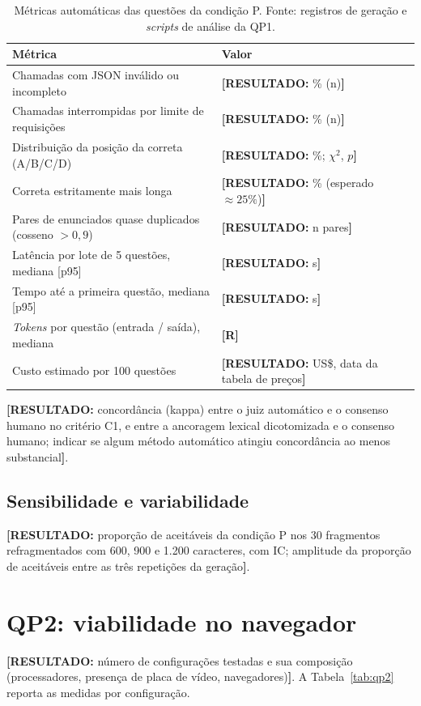 \documentclass[portuguese,oneside]{tcc}
\newcommand{\estr}[1]{\emph{#1}}
\newcommand{\resultado}[1]{\textcolor{red!70!black}{\textbf{[RESULTADO:} #1\textbf{]}}}
\newcommand{\rr}{\textcolor{red!70!black}{\textbf{[R]}}}
\begin{document}
\begin{table}[htbp]
\centering
\caption{Métricas automáticas das questões da condição P. Fonte: registros de geração e \estr{scripts} de análise da QP1.}
\label{tab:qp1-auto}
\small
\begin{tabularx}{\textwidth}{>{\raggedright\arraybackslash}X l}
\toprule
Métrica & Valor \\
\midrule
Chamadas com JSON inválido ou incompleto & \resultado{\% (n)} \\
Chamadas interrompidas por limite de requisições & \resultado{\% (n)} \\
Distribuição da posição da correta (A/B/C/D) & \resultado{\%; $\chi^2$, $p$} \\
Correta estritamente mais longa & \resultado{\% (esperado $\approx 25\%$)} \\
Pares de enunciados quase duplicados (cosseno $> 0{,}9$) & \resultado{n pares} \\
Latência por lote de 5 questões, mediana [p95] & \resultado{s} \\
Tempo até a primeira questão, mediana [p95] & \resultado{s} \\
\estr{Tokens} por questão (entrada / saída), mediana & \rr \\
Custo estimado por 100 questões & \resultado{US\$, data da tabela de preços} \\
\bottomrule
\end{tabularx}
\end{table}

\resultado{concordância (kappa) entre o juiz automático e o consenso humano no critério C1, e entre a ancoragem lexical dicotomizada e o consenso humano; indicar se algum método automático atingiu concordância ao menos substancial}.

\subsection{Sensibilidade e variabilidade}

\resultado{proporção de aceitáveis da condição P nos 30 fragmentos refragmentados com 600, 900 e 1.200 caracteres, com IC; amplitude da proporção de aceitáveis entre as três repetições da geração}.

\section{QP2: viabilidade no navegador}

\resultado{número de configurações testadas e sua composição (processadores, presença de placa de vídeo, navegadores)}. A Tabela~\ref{tab:qp2} reporta as medidas por configuração.
\end{document}
